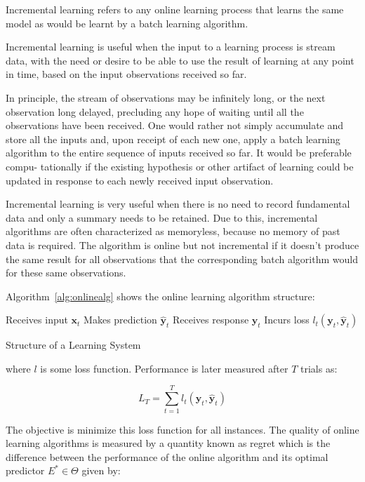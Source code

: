 Incremental learning refers to any online learning process that learns the same
model as would be learnt by a batch learning algorithm. 

Incremental learning is useful when the input to a learning process is stream
data, with the need or desire to be able to use the result of learning at any
point in time, based on the input observations received so far. 

In principle, the stream of observations may be infinitely long, or the next
observation long delayed, precluding any hope of waiting until all the
observations have been received. One would rather not simply accumulate and
store all the inputs and, upon receipt of each new one, apply a batch learning
algorithm to the entire sequence of inputs received so far. It would be
preferable compu- tationally if the existing hypothesis or other artifact of
learning could be updated in response to each newly received input observation.

Incremental learning is very useful when there is no need to record fundamental
data and only a summary needs to be retained. Due to this, incremental
algorithms are often characterized as memoryless, because no memory of past data
is required.  The algorithm is online but not incremental if it doesn't produce
the same result for all observations that the corresponding batch algorithm
would for these same observations.

Algorithm~\ref{alg:onlinealg} shows the online learning algorithm structure:

\begin{algorithm}[ht]
\begin{algorithmic}[1]
    \STATE Receives input $\mathbf{x}_t$
    \STATE Makes prediction $\mathbf{\hat{y}}_t$
    \STATE Receives response $\mathbf{y}_t$
    \STATE Incurs loss $l_t(\mathbf{y}_t,\mathbf{\hat{y}}_t)$
\end{algorithmic}
\caption{Structure of a Learning System}
\label{alg:onlinealg}
\end{algorithm}

\noindent where $l$ is some loss function. Performance is later measured after
$T$ trials as:

\begin{equation*}
L_T = \sum_{t=1}^T l_t(\mathbf{y}_t,\mathbf{\hat{y}}_t)
\end{equation*}

The objective is minimize this loss function for all instances.
The quality of online learning algorithms is measured by a quantity known as
regret which is the difference between the performance of the online algorithm
and its optimal predictor $E^* \in \Theta$ given by:

